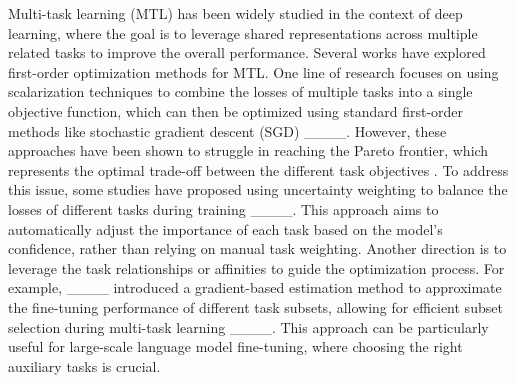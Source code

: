 Multi-task learning (MTL) has been widely studied in the context of deep learning, where the goal is to leverage shared representations across multiple related tasks to improve the overall performance. Several works have explored first-order optimization methods for MTL.
One line of research focuses on using scalarization techniques to combine the losses of multiple tasks into a single objective function, which can then be optimized using standard first-order methods like stochastic gradient descent (SGD) ____. However, these approaches have been shown to struggle in reaching the Pareto frontier, which represents the optimal trade-off between the different task objectives .
To address this issue, some studies have proposed using uncertainty weighting to balance the losses of different tasks during training ____. This approach aims to automatically adjust the importance of each task based on the model's confidence, rather than relying on manual task weighting.
Another direction is to leverage the task relationships or affinities to guide the optimization process. For example, ____ introduced a gradient-based estimation method to approximate the fine-tuning performance of different task subsets, allowing for efficient subset selection during multi-task learning ____. This approach can be particularly useful for large-scale language model fine-tuning, where choosing the right auxiliary tasks is crucial.